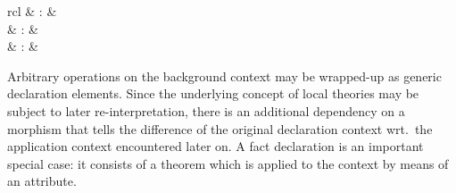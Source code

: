 \begin{isabellebody}
\begin{isamarkuptext}
\begin{description}
  \end{description}%
\end{isamarkuptext}%
\isamarkuptrue%
%
\isamarkuptrue%
%
\begin{isamarkuptext}%
\begin{matharray}{rcl}
    \hypertarget{command.declaration}{\hyperlink{command.declaration}{\mbox{}}} & : &  \\
    \hypertarget{command.syntax-declaration}{\hyperlink{command.syntax-declaration}{\mbox{}}} & : &  \\
    \hypertarget{command.declare}{\hyperlink{command.declare}{\mbox{}}} & : &  \\
  \end{matharray}

  Arbitrary operations on the background context may be wrapped-up as
  generic declaration elements.  Since the underlying concept of local
  theories may be subject to later re-interpretation, there is an
  additional dependency on a morphism that tells the difference of the
  original declaration context wrt.\ the application context
  encountered later on.  A fact declaration is an important special
  case: it consists of a theorem which is applied to the context by
  means of an attribute.


\end{isamarkuptext}
\end{isabellebody}
